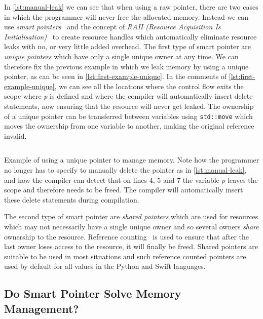 \documentclass{proposal}
\begin{document}

    In \autoref{lst:manual-leak} we can see that when using a raw pointer, there are two cases in which the programmer will never free the allocated memory.
    Instead we can use \emph{smart pointers}~\cite{Dimov2003} and the concept of \emph{RAII (Resource Acquisition Is Initialisation)}~\cite{Stroustrup2000} to create resource handles which automatically eliminate resource leaks with no, or very little added overhead.
    The first type of smart pointer are \emph{unique pointers} which have only a single unique owner at any time.
    We can therefore fix the previous example in which we leak memory by using a unique pointer, as can be seen in \autoref{lst:first-example-unique}.
    In the comments of \autoref{lst:first-example-unique}, we can see all the locations where the control flow exits the scope where \emph{p} is defined and where the compiler will automatically insert delete statements, now ensuring that the resource will never get leaked.
    The ownership of a unique pointer can be transferred between variables using \texttt{std::move} which moves the ownership from one variable to another, making the original reference invalid.

    \begin{listing}
        \inputminted{c++}{code/first-example-unique.cpp}
        \caption{Example of using a unique pointer to manage memory. Note how the programmer no longer has to specify to manually delete the pointer as in \autoref{lst:manual-leak}, and how the compiler can detect that on lines 4, 5 and 7 the variable $p$ leaves the scope and therefore needs to be freed. The compiler will automatically insert these delete statements during compilation.}
        \label{lst:first-example-unique}
    \end{listing}

    The second type of smart pointer are \emph{shared pointers} which are used for resources which may not necessarily have a single unique owner and so several owners \emph{share} ownership to the resource.
    Reference counting~\cite{Collins1960} is used to ensure that after the last owner loses access to the resource, it will finally be freed.
    Shared pointers are suitable to be used in most situations and such reference counted pointers are used by default for all values in the Python and Swift languages.

    \subsection{Do Smart Pointer Solve Memory Management?}\label{subsec:do-smart-pointer-solve-memory-management?}
\end{document}
